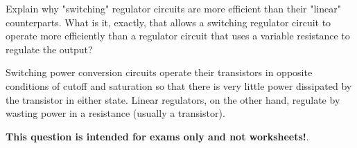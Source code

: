 

Explain why "switching" regulator circuits are more efficient than their "linear" counterparts.  What is it, exactly, that allows a switching regulator circuit to operate more efficiently than a regulator circuit that uses a variable resistance to regulate the output?







Switching power conversion circuits operate their transistors in opposite conditions of cutoff and saturation so that there is very little power dissipated by the transistor in either state.  Linear regulators, on the other hand, regulate by wasting power in a resistance (usually a transistor).







{\bf This question is intended for exams only and not worksheets!}.




